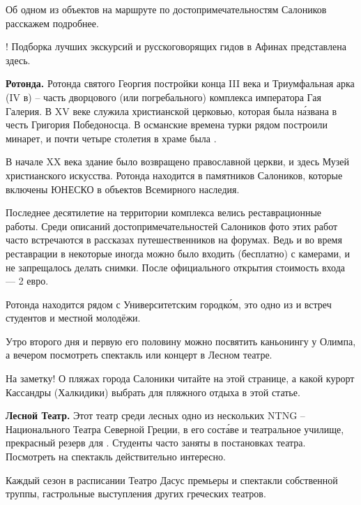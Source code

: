 Об одном из объектов на маршруте по достопримечательностям Салоников расскажем подробнее.

! Подборка лучших экскурсий и русскоговорящих гидов в Афинах представлена здесь.

\textbf{Ротонда.} Ротонда святого Георгия постройки конца III века и Триумфальная арка (IV в) – часть дворцового (или погребального) комплекса императора Гая Галерия. В XV веке служила христианской церковью, которая была н\'{а}звана в честь Григория Победоносца. В османские времена турки рядом построили минарет, и почти четыре столетия в храме была .

В начале XX века здание было возвращено православной церкви, и  здесь Музей христианского искусства. Ротонда находится в  памятников Салоников, которые включены ЮНЕСКО в  объектов Всемирного наследия.

Последнее десятилетие на территории комплекса велись реставрационные работы. Среди описаний достопримечательностей Салоников фото этих работ часто встречаются в рассказах путешественников на форумах. Ведь и во время реставрации в некоторые  иногда можно было входить (бесплатно) с камерами, и не запрещалось делать снимки. После официального открытия стоимость входа — 2 евро.

Ротонда находится рядом с Университетским городк\'{о}м, это одно из  и встреч студентов и местной молодёжи.

Утро второго дня и первую его половину можно посвятить каньонингу у Олимпа, а вечером посмотреть спектакль или концерт в Лесном театре.

На заметку! О пляжах  города Салоники читайте на этой странице, а какой курорт Кассандры (Халкидики) выбрать для пляжного отдыха в этой статье.

\textbf{Лесной Театр.}  Этот театр среди лесных  одно из нескольких  NTNG – Национального Театра Северной Греции, в его сост\'{а}ве и театральное училище, прекрасный резерв для . Студенты часто заняты в постановках театра. Посмотреть на спектакль действительно интересно.

Каждый сезон в расписании Театро Дасус премьеры и  спектакли собственной труппы, гастрольные выступления других греческих театров.

